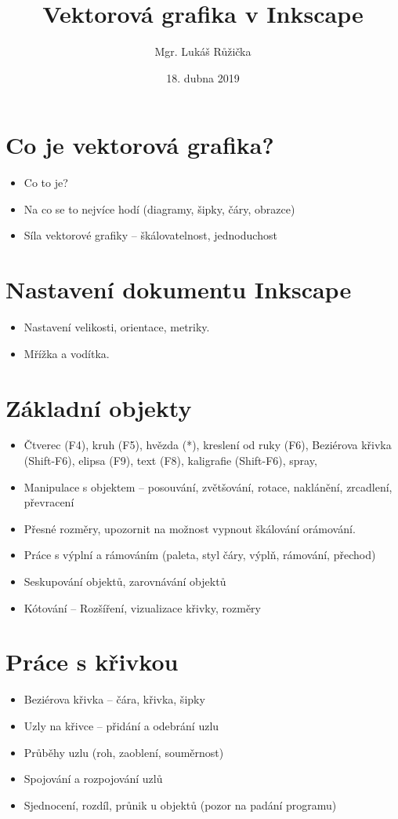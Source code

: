 \documentclass[12pt,a4paper]{article}
\title{Vektorová grafika v Inkscape}
\author{Mgr. Lukáš Růžička}
\date{18. dubna 2019}
\begin{document}
\maketitle

\section{Co je vektorová grafika?}
	\begin{itemize}
		\item Co to je?
	 	\item Na co se to nejvíce hodí (diagramy, šipky, čáry, obrazce)
	 	\item Síla vektorové grafiky -- škálovatelnost, jednoduchost
	\end{itemize}

\section{Nastavení dokumentu Inkscape}
\begin{itemize}
	\item Nastavení velikosti, orientace, metriky.
	\item Mřížka a vodítka.
\end{itemize}

\section{Základní objekty}
	\begin{itemize}
		\item Čtverec (F4), kruh (F5), hvězda (*), kreslení od ruky (F6), Beziérova křivka (Shift-F6), elipsa (F9), text (F8), kaligrafie (Shift-F6), spray, 
		\item Manipulace s objektem -- posouvání, zvětšování, rotace, naklánění, zrcadlení, převracení
		\item Přesné rozměry, upozornit na možnost vypnout škálování orámování.
		\item Práce s výplní a rámováním (paleta, styl čáry, výplň, rámování, přechod)
		\item Seskupování objektů, zarovnávání objektů
		\item Kótování -- Rozšíření, vizualizace křivky, rozměry
	\end{itemize}	

\section{Práce s křivkou}
 \begin{itemize}
		\item Beziérova křivka -- čára, křivka, šipky
		\item Uzly na křivce -- přidání a odebrání uzlu
		\item Průběhy uzlu (roh, zaoblení, souměrnost)
		\item Spojování a rozpojování uzlů
		\item Sjednocení, rozdíl, průnik u objektů (pozor na padání programu)
	\end{itemize}
	
\end{document}
